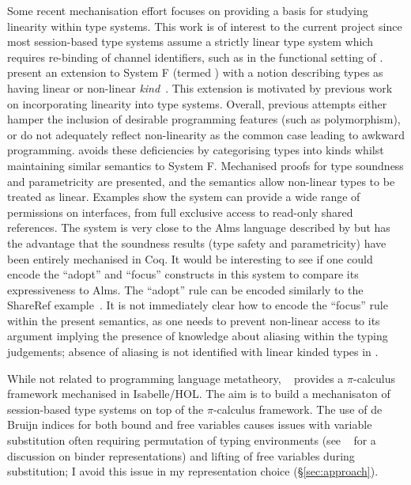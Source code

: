 Some recent mechanisation effort focuses on providing a basis for studying
linearity within type systems. This work is of interest to the current project
since most session-based type systems assume a strictly linear type system
which requires re-binding of channel identifiers, such as in the functional
setting of \citeauthor{Gay:2010:LAST}. \citeauthor{Mazurak:2010:LLT} present
an extension to System F (termed \fpop) with a notion describing types as
having linear or non-linear \textit{kind}~\cite{Mazurak:2010:LLT}. This
extension is motivated by previous work on incorporating linearity into type
systems. Overall, previous attempts either hamper the inclusion of desirable
programming features (such as polymorphism), or do not adequately reflect
non-linearity as the common case leading to awkward programming. \fpop avoids
these deficiencies by categorising types into kinds whilst maintaining similar
semantics to System F. Mechanised proofs for type soundness and parametricity
are presented, and the semantics allow non-linear types to be treated as
linear. Examples show the system can provide a wide range of permissions on
interfaces, from full exclusive access to read-only shared references. The
system is very close to the Alms language described by
\citeauthor{Aldrich:2009} but has the advantage that the soundness results
(type safety and parametricity) have been entirely mechanised in Coq. It would
be interesting to see if one could encode the ``adopt'' and ``focus''
constructs in this system to compare its expressiveness to Alms. The ``adopt''
rule can be encoded similarly to the ShareRef
example~\cite{Mazurak:2010:LLT}. It is not immediately clear how to encode the
``focus'' rule within the present semantics, as one needs to prevent
non-linear access to its argument implying the presence of knowledge about
aliasing within the typing judgements; absence of aliasing is not identified
with linear kinded types in \fpop.

While not related to programming language metatheory,
\citeauthor{Gay:2001:FFP}~\cite{Gay:2001:FFP} provides a $\pi$-calculus
framework mechanised in Isabelle/HOL. The aim is to build a mechanisaton of
session-based type systems on top of the $\pi$-calculus framework. The use of
de Bruijn indices for both bound and free variables causes issues with
variable substitution often requiring permutation of typing environments (see
\citeauthor{Aydemir:2008:EFM}~\cite{Aydemir:2008:EFM} for a discussion on
binder representations) and lifting of free variables during substitution; I
avoid this issue in my representation choice (\S \ref{sec:approach}).

